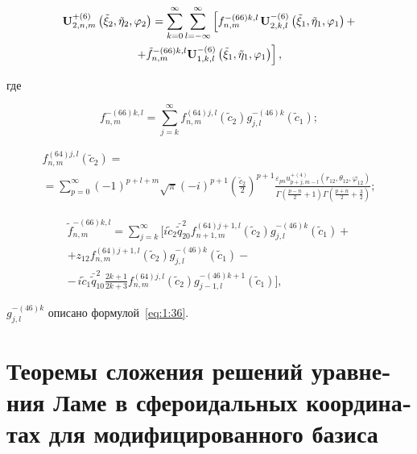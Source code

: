 \begin{russian}
\begin{theorem}
\begin{multline}\label{eq:1:85}
{\bf{U}}_{2,n,m}^{ + (6)}\left( {{{\tilde \xi }_2},{{\tilde \eta }_2},{\varphi _2}} \right) = \sum\limits_{k = 0}^\infty  {\sum\limits_{l =  - \infty }^\infty  {\left[ {f_{n,m}^{ - (66)k,l}} \right.} } {\bf{U}}_{2,k,l}^{ - (6)}\left( {{{\tilde \xi }_1},{{\tilde \eta }_1},{\varphi _1}} \right) + \\
\left. { + \tilde f_{n,m}^{ - (66)k,l}{\bf{U}}_{1,k,l}^{ - (6)}\left( {{{\tilde \xi }_1},{{\tilde \eta }_1},{\varphi _1}} \right)} \right],
\end{multline}

\noindent где

\begin{equation}\label{eq:1:86}
f_{n,m}^{ - (66)k,l} = \sum\limits_{j = k}^\infty  {f_{n,m}^{(64)j,l}({{\tilde c}_2})g_{j,l}^{ - (46)k}} ({\tilde c_1});
\end{equation}

\begin{multline}\label{eq:1:87}
f_{n,m}^{(64)j,l}({\tilde c_2}) = \\
= \sum\limits_{p = 0}^\infty  {{{( - 1)}^{p + l + m}}} \sqrt \pi  {( - i)^{p + 1}}{\left( {\frac{{{{\tilde c}_2}}}{2}} \right)^{p + 1}}\frac{{{\varepsilon _{pn}}u_{p + j,m - l}^{ + (4)}\left( {{r_{12}},{\theta _{12}},{\varphi _{12}}} \right)}}{{\Gamma \left( {\frac{{p - n}}{2} + 1} \right)\Gamma \left( {\frac{{p + n}}{2} + \frac{3}{2}} \right)}};
\end{multline}

\begin{multline}\label{eq:1:88}
\tilde f_{n,m}^{ - (66)k,l} = \sum\limits_{j = k}^\infty\bigg[i{{\tilde c}_2}\bar{\tilde q}_{20}^2f_{n + 1,m}^{(64)j + 1,l}({{\tilde c}_2})g_{j,l}^{ - (46)k}({{\tilde c}_1}) + \\
+ {z_{12}}f_{n,m}^{(64)j + 1,l}({{\tilde c}_2})g_{j,l}^{ - (46)k}({{\tilde c}_1}) - \\
- {\frac{{}}{{}}i{{\tilde c}_1}\bar{\tilde q}_{10}^2\frac{{2k + 1}}{{2k + 3}}f_{n,m}^{(64)j,l}({{\tilde c}_2})g_{j - 1,l}^{ - (46)k + 1}({{\tilde c}_1})} \bigg],
\end{multline}

\noindent $g_{j,l}^{ - (46)k}$ описано формулой~\eqref{eq:1:36}.
\end{theorem}

\section[Теоремы сложения решений уравнения Ламе в сфероидальных координатах для модифицированного базиса]{Теоремы сложения решений уравнения Ламе в сфероидальных координатах для модифицированного базиса}


\end{russian}
